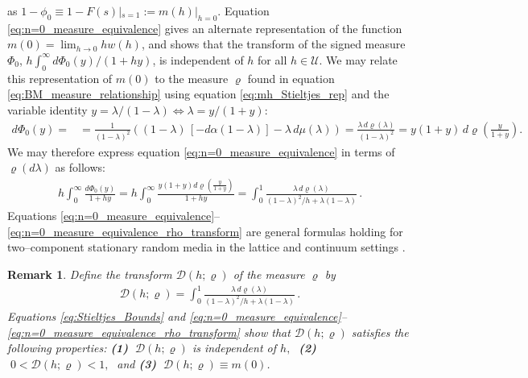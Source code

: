 \documentclass[english,12pt,jmp,graphicx]{revtex4-1}
\newtheorem{remark}{Remark}[section]
\newcommand{\ph}{\hat{\phi}}
\begin{document}
%
as $1-\phi_0\equiv1-F(s)|_{s=1}:=m(h)|_{h=0}$. Equation \eqref{eq:n=0_measure_equivalence}
gives an alternate representation of the function $m(0)=\lim_{h\to0}hw(h)$, and
shows that the transform of the signed measure \cite{Rudin:87} $\Phi_0$,
$h\int_0^\infty d\Phi_0(y)/(1+hy)$, is independent of $h$ for all $h\in\mathcal{U}$. We may 
relate this representation of $m(0)$ to the measure $\varrho$ found in
equation \eqref{eq:BM_measure_relationship} using equation
\eqref{eq:mh_Stieltjes_rep} and the variable identity $y=\lambda/(1-\lambda)\iff\lambda=y/(1+y)$:       
%
\begin{align*}%
  d\Phi_0(y)%
        =%
        &=\frac{1}{(1-\lambda)^2}((1-\lambda)\,[-d\alpha(1-\lambda)]-\lambda\,d\mu(\lambda))
        =\frac{\lambda\,d\varrho(\lambda)}{(1-\lambda)^2}=y(1+y)\,d\varrho\left(\frac{y}{1+y}\right).%
\end{align*}
%
We may therefore express equation \eqref{eq:n=0_measure_equivalence}
in terms of $\varrho(d\lambda)$ as follows: 
%
\begin{align}\label{eq:n=0_measure_equivalence_rho_transform}
   h\int_0^\infty\frac{d\Phi_0(y)}{1+hy}
      =h\int_0^\infty\frac{y(1+y)d\varrho(\frac{y}{1+y})}{1+hy}
      =\int_0^1\frac{\lambda\,d\varrho(\lambda)}{(1-\lambda)^2/h+\lambda(1-\lambda)}\,.
\end{align}
%
Equations 
\eqref{eq:n=0_measure_equivalence}--\eqref{eq:n=0_measure_equivalence_rho_transform}
are general formulas holding for two--component stationary random media
in the lattice and continuum settings \cite{Golden:PRL-3935}. 
%
\begin{remark}\label{rem:varrho_conditions}
  Define the transform $\mathcal{D}(h;\varrho)$ of the measure $\varrho$ by
  \begin{align}\label{eq:D_varrho}
    \mathcal{D}(h;\varrho)=\int_0^1\frac{\lambda\,d\varrho(\lambda)}{(1-\lambda)^2/h+\lambda(1-\lambda)}\,.
  \end{align}
  Equations \eqref{eq:Stieltjes_Bounds} and 
  \eqref{eq:n=0_measure_equivalence}--\eqref{eq:n=0_measure_equivalence_rho_transform}
  show that $\mathcal{D}(h;\varrho)$ satisfies the following properties:
  \newline
  \textbf{(1)} $\;\mathcal{D}(h;\varrho)$ is independent of $h,\;$ \textbf{(2)}
  $\;0<\mathcal{D}(h;\varrho)<1,\;$ and \textbf{(3)} $\;\mathcal{D}(h;\varrho)\equiv m(0)$. 
\end{remark}
\end{document}
